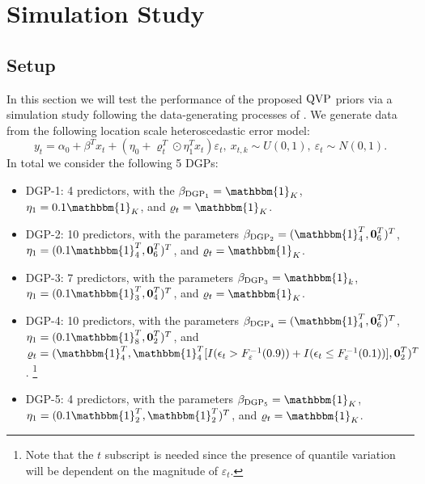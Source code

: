 \section{Simulation Study}\label{sec:simulation}
\subsection{Setup}
In this section we will test the performance of the proposed $\operatorname{QVP}$ priors via a simulation study following the data-generating processes of \citet{bondell2010noncrossing}. 
%
We generate data from the following location scale heteroscedastic error model:
%
\begin{equation} \label{eq:loc-scale}
    y_t=\alpha_0+\beta^Tx_t+(\eta_0+\varrho^T_t \odot \eta_1^Tx_t)\varepsilon_t,~x_{t,k}\sim U(0,1),~\varepsilon_t\sim N(0,1).
\end{equation}
%
In total we consider the following 5 DGPs: 
%
\begin{itemize}
    \item $\mathrm{DGP}$-1: 4 predictors, with the $\beta_{\mathrm{DGP}_1}=\mathbbm{1}_K$, $\eta_1=0.1\mathbbm{1}_K$, and $\varrho_t=\mathbbm{1}_K$.
    \item $\mathrm{DGP}$-2: 10 predictors, with the parameters $\beta_{\mathrm{DGP}_2}=(\mathbbm{1}_4^T,\textbf{0}_6^T)^T$, $\eta_1=(0.1\mathbbm{1}_4^T,\textbf{0}_6^T)^T$, and $\varrho_t=\mathbbm{1}_K$.
    \item $\mathrm{DGP}$-3: 7 predictors, with the parameters $\beta_{\mathrm{DGP}_3}=\mathbbm{1}_k$, $\eta_1=(0.1\mathbbm{1}_3^T,\textbf{0}_4^T)^T$, and $\varrho_t=\mathbbm{1}_K$.
    \item $\mathrm{DGP}$-4: 10 predictors, with the parameters $\beta_{\mathrm{DGP}_4}=(\mathbbm{1}_4^T,\textbf{0}_6^T)^T$, $\eta_1=(0.1\mathbbm{1}_8^T,\textbf{0}_2^T)^T$, and $\varrho_t=(\mathbbm{1}_4^T,\mathbbm{1}_4^T  [I(\epsilon_t> F^{-1}_\varepsilon(0.9))+I(\epsilon_t\leq F^{-1}_\varepsilon(0.1))],\textbf{0}_2^T)^T$.%
    \footnote{Note that the $t$ subscript is needed since the presence of quantile variation will be dependent on the magnitude of $\varepsilon_t$.}
    \item $\mathrm{DGP}$-5: 4 predictors, with the parameters $\beta_{\mathrm{DGP}_5}=\mathbbm{1}_K$, $\eta_1=(0.1\mathbbm{1}_2^T,\mathbbm{1}_2^T)^T$, and $\varrho_t=\mathbbm{1}_K$.
\end{itemize}
%
